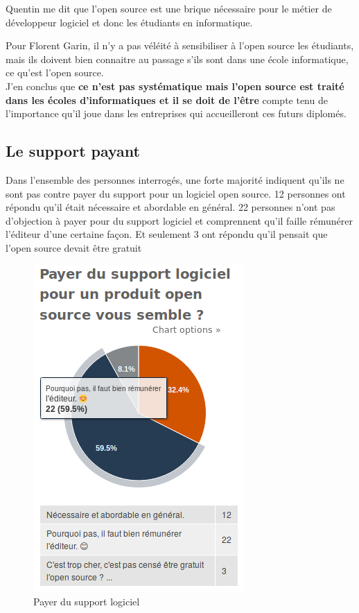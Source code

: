 				\newpage

				Quentin  me dit que l'open source est une brique nécessaire pour le métier de développeur logiciel et donc les étudiants en informatique.

				\begin{center}
					\textit{
					}
				\end{center}

				Pour Florent Garin, il n'y a pas véléité à sensibiliser à l'open source les étudiants, mais ils doivent bien connaitre au passage s'ils sont dans une école informatique, ce qu'est l'open source.\\

				J'en conclus que \textbf{ce n'est pas systématique mais l'open source est traité dans les écoles d'informatiques et il se doit de l'être} compte tenu de l'importance qu'il joue dans les entreprises qui accueilleront ces futurs diplomés.

		\subsection{Le support payant}

			Dans l'ensemble des personnes interrogés, une forte majorité indiquent qu'ils ne sont pas contre payer du support pour un logiciel open source. 12 personnes ont répondu qu'il était nécessaire et abordable en général. 22 personnes n'ont pas d'objection à payer pour du support logiciel et comprennent qu'il faille rémunérer l'éditeur d'une certaine façon. Et seulement 3 ont répondu qu'il pensait que l'open source devait être gratuit

			\begin{figure}[!htb]
				\center
				\includegraphics[scale=0.58]{./img/a11}
				\caption{Payer du support logiciel}					
			\end{figure}

